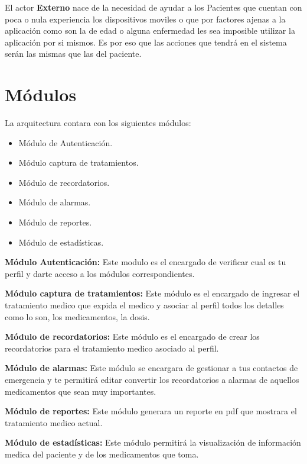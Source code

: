 El actor \textbf{Externo} nace de la necesidad de ayudar a los Pacientes que cuentan con poca o nula experiencia los dispositivos moviles o que por factores ajenas a la aplicación como son la de edad o alguna enfermedad les sea imposible utilizar la aplicación por si mismos. Es por eso que las acciones que tendrá en el sistema serán las mismas que las del paciente.

\section{Módulos}
La arquitectura contara con los siguientes módulos:
\begin{itemize}
	\item Módulo de Autenticación.
	\item Módulo captura de tratamientos.
	\item Módulo de recordatorios.
	\item Módulo de alarmas.
	\item Módulo de reportes.
	\item Módulo de estadísticas.
\end{itemize}

\textbf{Módulo Autenticación: } Este modulo es el encargado de verificar cual es tu perfil y darte acceso a los módulos correspondientes.

\textbf{Módulo captura de tratamientos: }Este módulo es el encargado de ingresar el tratamiento medico que expida el medico y asociar al perfil todos los detalles como lo son, los medicamentos, la dosis.

\textbf{Módulo de recordatorios: }Este módulo es el encargado de crear los recordatorios para el tratamiento medico asociado al perfil.

\textbf{Módulo de alarmas: }Este módulo se encargara de gestionar a tus contactos de emergencia y te permitirá editar convertir los recordatorios a alarmas de aquellos medicamentos que sean muy importantes.

\textbf{Módulo de reportes: }Este módulo generara un reporte en pdf que mostrara el tratamiento medico actual.

\textbf{Módulo de estadísticas:} Este módulo permitirá la visualización de información medica del paciente y de los medicamentos que toma.